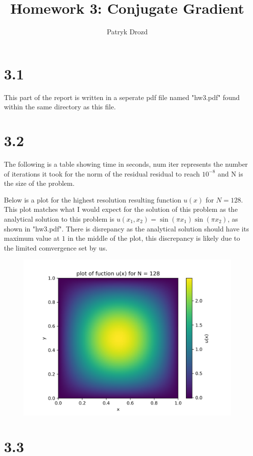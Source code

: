 \documentclass[a4paper]{article}
\title{Homework 3: Conjugate Gradient}
\author{Patryk Drozd}
\begin{document}
\date{}
\maketitle


\section*{3.1}
	This part of the report is written in a seperate pdf file named "hw3.pdf" found
	within the same directory as this file.
\section*{3.2}
	
	The following is a table showing time in seconds, num iter represents the number of 
	iterations it took for the norm of the residual residual to reach $10^{-8}$ and N
	is the size of the problem.
	
	\begin{center}
	\end{center}
	\vspace{0.3cm}

	Below is a plot for the highest resolution resulting function $u(x)$ for $N=128$.
	This plot matches what I would expect for the solution of this problem as the 
	analytical solution to this problem is $u(x_1, x_2) = \sin(\pi x_1)\sin(\pi x_2)$, as shown
	in "hw3.pdf". There is disrepancy as the analytical solution should have its 
	maximum value at $1$ in the middle of the plot, this discrepancy is likely
	due to the limited comvergence set by us.

	\begin{figure}[h!]
        \centering
        \includegraphics[width=.6\linewidth]{./q2plot.png}
        \caption{}
        \label{fig:q2_fig}
    \end{figure}	


\section*{3.3}
	
\end{document}
